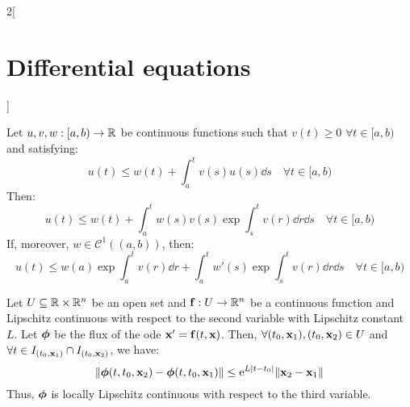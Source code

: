 \documentclass[../../../main.tex]{subfiles}
\begin{document}
\begin{multicols}{2}[\section{Differential equations}]
\begin{theorem}
    \end{theorem}
    \begin{lemma}
        Let $u,v,w:[a,b)\rightarrow\mathbb{R}$ be continuous functions such that $v(t)\geq 0$ $\forall t\in[a,b)$ and satisfying: $$u(t)\leq w(t)+\int_a^tv(s)u(s)\dd s\quad\forall t\in[a,b)$$
        Then: $$u(t)\leq w(t)+\int_a^tw(s)v(s)\exp{\int_s^tv(r)\dd r}\dd s\quad\forall t\in[a,b)$$
        If, moreover, $w\in\mathcal{C}^1((a,b))$, then: $$u(t)\leq w(a)\exp{\int_a^tv(r)\dd r}+\int_a^tw'(s)\exp{\int_s^tv(r)\dd r}\dd s\quad\forall t\in[a,b)$$
    \end{lemma}
    \begin{prop}
        Let $U\subseteq\mathbb{R}\times\mathbb{R}^n$ be an open set and $\boldsymbol{\mathrm{f}}:U\rightarrow\mathbb{R}^n$ be a continuous function and Lipschitz continuous with respect to the second variable with Lipschitz constant $L$. Let $\boldsymbol{\mathrm{\phi}}$ be the flux of the ode $\boldsymbol{\mathrm{x}}'=\boldsymbol{\mathrm{f}}(t,\boldsymbol{\mathrm{x}})$. Then, $\forall (t_0,\boldsymbol{\mathrm{x}}_1),(t_0,\boldsymbol{\mathrm{x}}_2)\in U$ and $\forall t\in I_{(t_0,\boldsymbol{\mathrm{x}}_1)}\cap I_{(t_0,\boldsymbol{\mathrm{x}}_2)}$, we have:
        $$\|\boldsymbol{\mathrm{\phi}}(t,t_0,\boldsymbol{\mathrm{x}}_2)-\boldsymbol{\mathrm{\phi}}(t,t_0,\boldsymbol{\mathrm{x}}_1)\|\leq\mathrm{e}^{L|t-t_0|}\|\boldsymbol{\mathrm{x}}_2-\boldsymbol{\mathrm{x}}_1\|$$
        Thus, $\boldsymbol{\mathrm{\phi}}$ is locally Lipschitz continuous with respect to the third variable.
    \end{prop}

\end{multicols}
\end{document}
